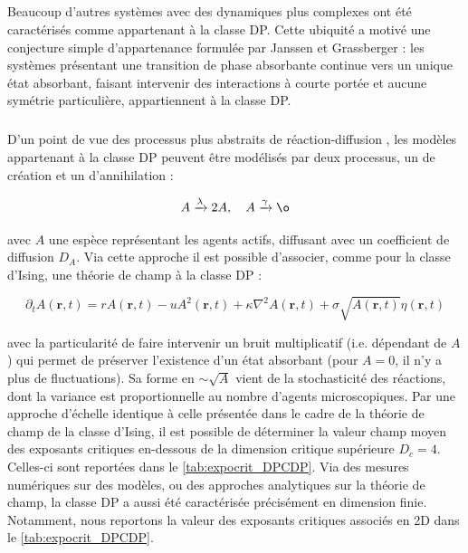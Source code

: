 \subparagraph{}Beaucoup d'autres systèmes avec des dynamiques plus complexes ont été caractérisés comme appartenant à la classe DP. Cette ubiquité a motivé une conjecture simple d'appartenance formulée par Janssen et Grassberger \cite{janssen_nonequilibrium_1981, grassberger_phase_1982} : les systèmes présentant une transition de phase absorbante continue vers un unique état absorbant, faisant intervenir des interactions à courte portée et aucune symétrie particulière, appartiennent à la classe DP.

\subparagraph{}D'un point de vue des processus plus abstraits de réaction-diffusion \cite{tauber_applications_2005}, les modèles appartenant à la classe DP peuvent être modélisés par deux processus, un de création et un d’annihilation :

\begin{equation}
A \xrightarrow[]{\lambda} 2A, \quad A \xrightarrow[]{\gamma} \o
\label{eq:ReacDiffDP}
\end{equation}

\noindent avec $A$ une espèce représentant les agents actifs, diffusant avec un coefficient de diffusion $D_A$. Via cette approche il est possible d'associer, comme pour la classe d'Ising, une théorie de champ à la classe DP :

\begin{equation}
	\partial_t A(\mathbf{r}, t) = rA(\mathbf{r}, t) - uA^2(\mathbf{r}, t) + \kappa\nabla^2 A (\mathbf{r}, t) + \sigma \sqrt{A(\mathbf{r}, t)} \eta(\mathbf{r}, t)
	\label{eq:eqDP}
\end{equation}

\noindent avec la particularité de faire intervenir un bruit multiplicatif (i.e. dépendant de $A$) qui permet de préserver l'existence d'un état absorbant (pour $A=0$, il n'y a plus de fluctuations). Sa forme en $\sim \sqrt{A}$ vient de la stochasticité des réactions, dont la variance est proportionnelle au nombre d'agents microscopiques.  Par une approche d'échelle identique à celle présentée dans le cadre de la théorie de champ de la classe d'Ising, il est possible de déterminer la valeur champ moyen des exposants critiques en-dessous de la dimension critique supérieure $D_c = 4$. Celles-ci sont reportées dans le \autoref{tab:expocrit_DPCDP}. Via des mesures numériques sur des modèles, ou des approches analytiques sur la théorie de champ, la classe DP a aussi été caractérisée précisément en dimension finie. Notamment, nous reportons la valeur des exposants critiques associés en 2D dans le \autoref{tab:expocrit_DPCDP}.

